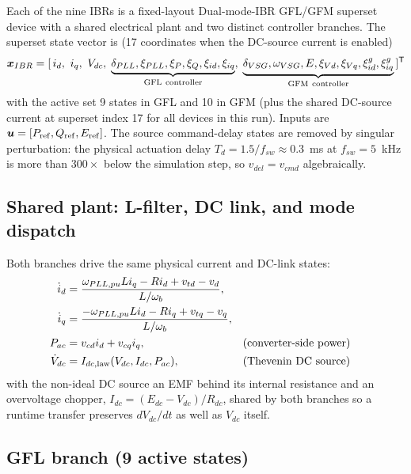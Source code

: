 Each of the nine IBRs is a fixed-layout Dual-mode-IBR GFL/GFM superset device with a
shared electrical plant and two distinct controller branches.  The superset
state vector is (17 coordinates when the DC-source current is enabled)
\[
\boldsymbol{x}_{IBR}=[\,i_d,\ i_q,\ V_{dc},\;
\underbrace{\delta_{PLL},\xi_{PLL},\xi_P,\xi_Q,\xi_{id},\xi_{iq}}_{\rm GFL\ controller},\;
\underbrace{\delta_{VSG},\omega_{VSG},E,\xi_{Vd},\xi_{Vq},\xi_{id}^{g},\xi_{iq}^{g}}_{\rm GFM\ controller}\,]^{\mathsf T}
\]
with the active set 9 states in GFL and 10 in GFM (plus the shared DC-source
current at superset index 17 for all devices in this run).  Inputs are
$\boldsymbol{u}=[P_{\rm ref},Q_{\rm ref},E_{\rm ref}]$.  The source command-delay
states are removed by singular perturbation: the physical actuation delay
$T_d=1.5/f_{sw}\approx0.3$~ms at $f_{sw}=5$~kHz is more than $300\times$ below
the simulation step, so $v_{del}=v_{cmd}$ algebraically.

\subsection{Shared plant: L-filter, DC link, and mode dispatch}

Both branches drive the same physical current and DC-link states:
\begin{align}
\dot i_d&=\frac{\omega_{PLL,pu}L i_q-R i_d+v_{td}-v_d}{L/\omega_b},\\
\dot i_q&=\frac{-\omega_{PLL,pu}L i_d-R i_q+v_{tq}-v_q}{L/\omega_b},\\
P_{ac}&=v_{cd}i_d+v_{cq}i_q,&& \text{(converter-side power)}\\
\dot V_{dc}&=I_{dc,\rm law}(V_{dc},I_{dc},P_{ac}),&& \text{(Thevenin DC source)}
\end{align}
with the non-ideal DC source an EMF behind its internal resistance and an
overvoltage chopper, $I_{dc}=(E_{dc}-V_{dc})/R_{dc}$, shared by both branches
so a runtime transfer preserves $dV_{dc}/dt$ as well as $V_{dc}$ itself.

\subsection{GFL branch (9 active states)}

